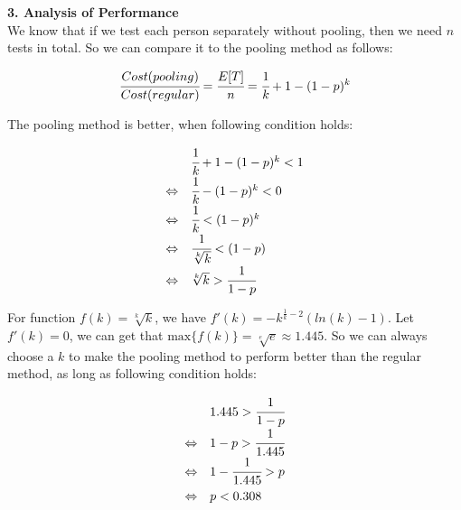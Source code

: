 \noindent
\textbf{3. Analysis of Performance}\\

We know that if we test each person separately without pooling, then we need $n$ tests in total. So we can compare it to the pooling method as follows:

\[
  \cfrac{Cost(pooling)}{Cost(regular)} = \cfrac{E[T]}{n} = \cfrac{1}{k} + 1 - (1 - p)^k
\]

The pooling method is better, when following condition holds:

\[
\def\arraystretch{1.5}
\begin{array}{l l}
                & \cfrac{1}{k} + 1 - (1 - p)^k < 1 \\
\Leftrightarrow & \cfrac{1}{k} - (1 - p)^k < 0 \\
\Leftrightarrow & \cfrac{1}{k} < (1 - p)^k \\
\Leftrightarrow & \cfrac{1}{\sqrt[k]{k}} < (1 - p) \\
\Leftrightarrow & \sqrt[k]{k} > \cfrac{1}{1 - p} \\
\end{array}
\]

For function $f(k) = \sqrt[k]{k}$, we have $f'(k) = -k^{\frac{1}{k}-2}(ln(k) - 1)$. Let $f'(k) = 0$, we can get that $\text{max}\{f(k)\} = \sqrt[e]{e} \approx 1.445$. So we can always choose a $k$ to make the pooling method to perform better than the regular method, as long as following condition holds:

\[
\def\arraystretch{1.5}
\begin{array}{l l}
                & 1.445 > \cfrac{1}{1 - p} \\
\Leftrightarrow & 1 - p > \cfrac{1}{1.445} \\
\Leftrightarrow & 1 - \cfrac{1}{1.445} > p \\
\Leftrightarrow & p < 0.308 \\
\end{array}
\]
